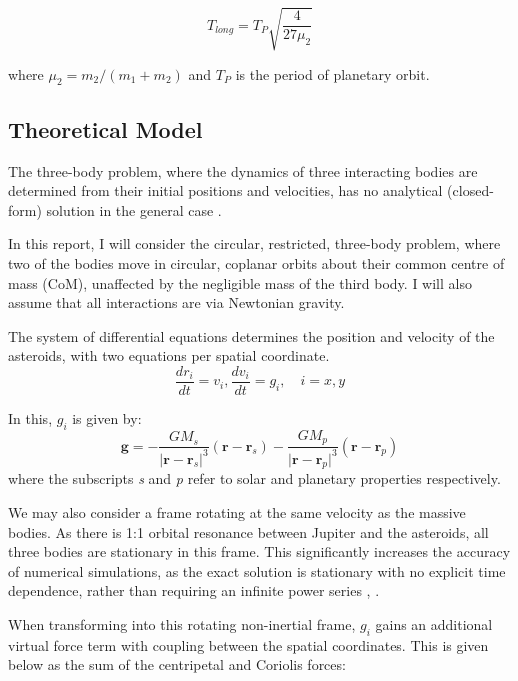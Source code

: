 \documentclass[11pt, a4paper,twocolumn]{article} %
\begin{document}
\begin{equation}
T_{long} = T_{P} \sqrt{\frac{4}{27 \mu_{2}}}  
\end{equation}

where $\mu_{2} = m_{2} / (m_{1} + m_{2})$ and $ T_{P} $ is the period of planetary orbit.

\subsection{Theoretical Model} \label{theory}
The three-body problem, where the dynamics of three interacting bodies are determined from their initial positions and velocities, has no analytical (closed-form) solution in the general case \cite{Barrow2008}.

In this report, I will consider the circular, restricted, three-body problem, where two of the bodies move in circular, coplanar orbits about their common centre of mass (CoM), unaffected by the negligible mass of the third body. I will also assume that all interactions are via Newtonian gravity.

The system of differential equations determines the position and velocity of the asteroids, with two equations per spatial coordinate.
\begin{equation}
\frac{dr_{i}}{dt} = v_{i}, \frac{dv_{i}}{dt} = g_{i}, \quad i = x,y 
\end{equation}

In this, $g_{i}$ is given by:
\begin{equation}
\textbf{g}= - \frac{G M_{s}}{\lvert \textbf{r} - \textbf{r}_{s} \rvert ^{3}} (\textbf{r} - \textbf{r}_{s})
		 - \frac{G M_{p}}{\lvert \textbf{r} - \textbf{r}_{p} \rvert ^{3}} (\textbf{r} - \textbf{r}_{p})
\end{equation}
where the subscripts \textit{s} and \textit{p} refer to solar and planetary properties respectively.

We may also consider a frame rotating at the same velocity as the massive bodies. As there is 1:1 orbital resonance between Jupiter and the asteroids, all three bodies are stationary in this frame. This significantly increases the accuracy of numerical simulations, as the exact solution is stationary with no explicit time dependence, rather than requiring an infinite power series \cite{Guglielmi2001}, \cite{LeVeque2007}.

When transforming into this rotating non-inertial frame, $g_{i}$ gains an additional virtual force term with coupling between the spatial coordinates. This is given below as the sum of the centripetal and Coriolis forces:
\end{document}
